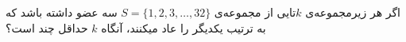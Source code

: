 اگر هر زیرمجموعه‌ی $k$تایی از مجموعه‌ی 
$S = \{1, 2, 3, \dots, 32\}$ سه عضو داشته باشد که به ترتیب یکدیگر را عاد میکنند، آنگاه $k$ حداقل چند است؟